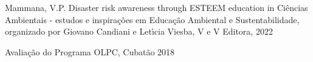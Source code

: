 \documentclass[
12pt,		%
openright,	%
twoside,  %
a4paper,			%
chapter=TITLE,		%
english,			%
french,				%
spanish,			%
brazil				%
]{USPSC-classe/USPSC}
\begin{document}
\begin{flushleft}
\begin{flushleft}
\begin{flushleft}
\begin{flushleft}
\begin{flushleft}
\begin{flushleft}
\begin{flushleft}
\begin{flushleft}
\begin{flushleft}
[MAMMANA et al., 2022a] Mammana, V.P. Disaster risk awareness through ESTEEM education in Ci\^encias Ambientais - estudos e inspira\c{c}\~oes em Educa\c{c}\~ao Ambiental e Sustentabilidade, organizado por Giovano Candiani e Let\'{\i}cia Viesba, V e V Editora, 2022
\end{flushleft}


\end{flushleft}


\end{flushleft}


\end{flushleft}


\end{flushleft}


\end{flushleft}


\end{flushleft}


\end{flushleft}


\end{flushleft}


\begin{flushleft}
\begin{flushleft}
\begin{flushleft}
\begin{flushleft}
\begin{flushleft}
\begin{flushleft}
\begin{flushleft}
\begin{flushleft}
\begin{flushleft}
 Avalia\c{c}\~ao do Programa OLPC, Cubat\~ao 2018
\end{flushleft}


\end{flushleft}


\end{flushleft}


\end{flushleft}


\end{flushleft}


\end{flushleft}


\end{flushleft}


\end{flushleft}


\end{flushleft}
\end{document}
